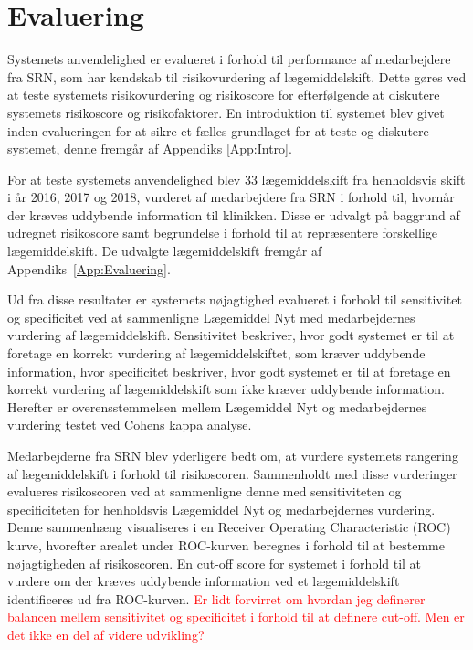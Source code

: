 \section{Evaluering}
Systemets anvendelighed er evalueret i forhold til performance af medarbejdere fra SRN, som har kendskab til risikovurdering af lægemiddelskift. Dette gøres ved at teste systemets risikovurdering og risikoscore for efterfølgende at diskutere systemets risikoscore og risikofaktorer. En introduktion til systemet blev givet inden evalueringen for at sikre et fælles grundlaget for at teste og diskutere systemet, denne fremgår af Appendiks \ref{App:Intro}. 

For at teste systemets anvendelighed blev 33 lægemiddelskift fra henholdsvis skift i år 2016, 2017 og 2018, vurderet af medarbejdere fra SRN i forhold til, hvornår der kræves uddybende information til klinikken. Disse er udvalgt på baggrund af udregnet risikoscore samt begrundelse i forhold til at repræsentere forskellige lægemiddelskift. De udvalgte lægemiddelskift fremgår af Appendiks~\ref{App:Evaluering}. 

Ud fra disse resultater er systemets nøjagtighed evalueret i forhold til sensitivitet og specificitet ved at sammenligne Lægemiddel Nyt med medarbejdernes vurdering af lægemiddelskift. Sensitivitet beskriver, hvor godt systemet er til at foretage en korrekt vurdering af lægemiddelskiftet, som kræver uddybende information, hvor specificitet beskriver, hvor godt systemet er til at foretage en korrekt vurdering af lægemiddelskift som ikke kræver uddybende information. Herefter er overensstemmelsen mellem Lægemiddel Nyt og medarbejdernes vurdering testet ved Cohens kappa analyse.

Medarbejderne fra SRN blev yderligere bedt om, at vurdere systemets rangering af lægemiddelskift i forhold til risikoscoren. Sammenholdt med disse vurderinger evalueres risikoscoren ved at sammenligne denne med sensitiviteten og specificiteten for henholdsvis Lægemiddel Nyt og medarbejdernes vurdering. Denne sammenhæng visualiseres i en Receiver Operating Characteristic (ROC) kurve, hvorefter arealet under ROC-kurven beregnes i forhold til at bestemme nøjagtigheden af risikoscoren. En cut-off score for systemet i forhold til at vurdere om der kræves uddybende information ved et lægemiddelskift identificeres ud fra ROC-kurven. \textcolor{red}{Er lidt forvirret om hvordan jeg definerer balancen mellem sensitivitet og specificitet i forhold til at definere cut-off. Men er det ikke en del af videre udvikling?} 

